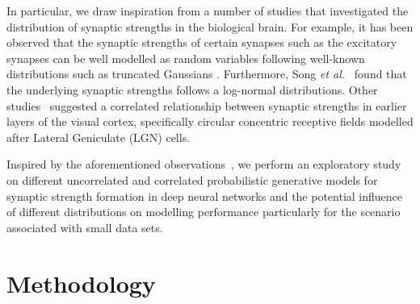 \documentclass[10pt,letterpaper]{article}
\begin{document}
In particular, we draw inspiration from a number of studies that investigated the distribution of synaptic strengths in the biological brain. For example, it has been observed that the synaptic strengths of certain synapses such as the excitatory synapses can be well modelled as random variables following well-known distributions such as truncated Gaussians \cite{barbour2007can}. Furthermore, Song {\it et al.}~\cite{song2005highly} found that the underlying synaptic strengths follows  a log-normal distributions. Other studies~ \cite{martinez2003complex, cheong2013cortical} suggested a correlated relationship between synaptic  strengths in earlier layers of the visual cortex, specifically circular concentric receptive fields modelled after Lateral Geniculate (LGN) cells.


Inspired by the aforementioned observations~\cite{song2005highly,martinez2003complex, cheong2013cortical}, we perform an exploratory study on different uncorrelated and correlated probabilistic generative models for synaptic strength formation in deep neural networks and the potential influence of different distributions on modelling performance particularly for the scenario associated with small data sets.


\section{Methodology}
\end{document}
